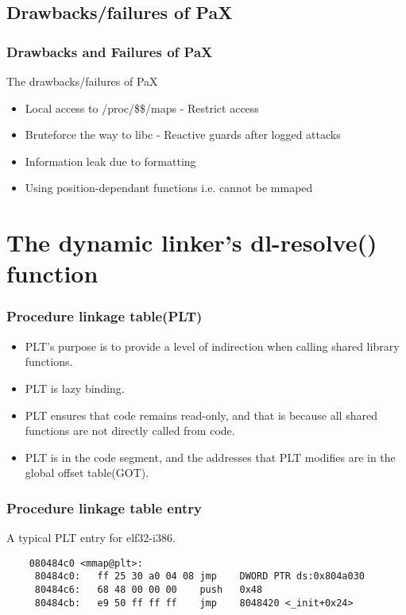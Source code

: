 \documentclass[10pt]{beamer}
\begin{document}
\subsection{Drawbacks/failures of PaX}
\begin{frame}
\frametitle{Drawbacks and Failures of PaX}
The drawbacks/failures of PaX
\begin{itemize}
\item Local access to /proc/\$\$/maps - Restrict access
\item Bruteforce the way to libc - Reactive guards after logged attacks
\item Information leak due to formatting
\item Using position-dependant functions i.e. cannot be mmaped
\end{itemize}
\end{frame}



\section{The dynamic linker's dl-resolve() function}  %

\begin{frame}[fragile]
\frametitle{Procedure linkage table(PLT)}

 \begin{itemize}
    \item PLT's purpose is to provide a level of indirection when calling shared library functions.
    \item PLT is lazy binding.
    \item PLT ensures that code remains read-only, and that is because all shared functions are not directly called from code.
    \item PLT is in the code segment, and the addresses that PLT modifies are in the global offset table(GOT).
  \end{itemize}

\end{frame}

\begin{frame}[fragile]
\frametitle{Procedure linkage table entry}
A typical PLT entry for elf32-i386.
	\begin{verbatim}
	080484c0 <mmap@plt>:
	 80484c0:	ff 25 30 a0 04 08 jmp    DWORD PTR ds:0x804a030
	 80484c6:	68 48 00 00 00    push   0x48
	 80484cb:	e9 50 ff ff ff    jmp    8048420 <_init+0x24>
	\end{verbatim}


\end{frame}
\end{document}
